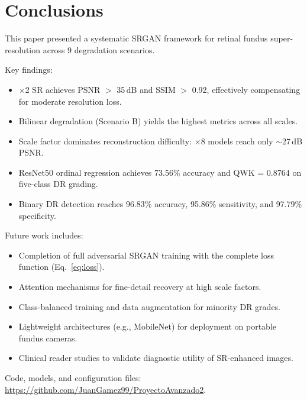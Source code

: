 \section{Conclusions}
\label{sec:conclusions}

This paper presented a systematic SRGAN framework for retinal fundus super-resolution across 9 degradation scenarios.

Key findings:
\begin{itemize}
    \item $\times$2 SR achieves PSNR $>$ 35\,dB and SSIM $>$ 0.92, effectively compensating for moderate resolution loss.
    \item Bilinear degradation (Scenario B) yields the highest metrics across all scales.
    \item Scale factor dominates reconstruction difficulty: $\times$8 models reach only $\sim$27\,dB PSNR.
    \item ResNet50 ordinal regression achieves 73.56\% accuracy and QWK = 0.8764 on five-class DR grading.
    \item Binary DR detection reaches 96.83\% accuracy, 95.86\% sensitivity, and 97.79\% specificity.
\end{itemize}

Future work includes:
\begin{itemize}
    \item Completion of full adversarial SRGAN training with the complete loss function (Eq.~\ref{eq:loss}).
    \item Attention mechanisms for fine-detail recovery at high scale factors.
    \item Class-balanced training and data augmentation for minority DR grades.
    \item Lightweight architectures (e.g., MobileNet) for deployment on portable fundus cameras.
    \item Clinical reader studies to validate diagnostic utility of SR-enhanced images.
\end{itemize}

Code, models, and configuration files: \url{https://github.com/JuanGamez99/ProyectoAvanzado2}.
